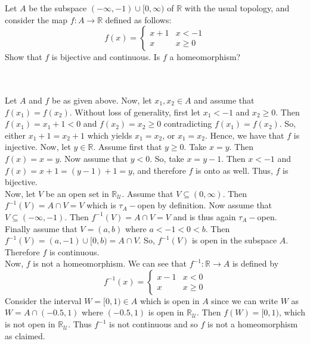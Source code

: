 Let $A$ be the subspace $(-\infty,-1)\cup [0,\infty)$ of $\mathbb{R}$ with the usual topology, and
consider the map $f:A\to \mathbb{R}$ defined as follows:
\[f(x)=\left\{ \begin{array}{ll}
                  x+1 & \mbox{$x<-1$}\\
                  x      & \mbox{$x\geq 0$}
                  \end{array}
          \right. \]
Show that $f$ is bijective and continuous. Is $f$ a homeomorphism?\\\\

\begin{solution}\renewcommand{\qedsymbol}{}\ \\
    Let $A$ and $f$ be as given above. Now, let $x_1,x_2\in A$ and assume that $f(x_1)=f(x_2)$. Without
    loss of generality, first let $x_1<-1$ and $x_2\geq0$. Then $f(x_1)=x_1+1<0$ and $f(x_2)=x_2\geq0$
    contradicting $f(x_1)=f(x_2)$. So, either $x_1+1=x_2+1$ which yields $x_1=x_2$, or $x_1=x_2$. Hence,
    we have that $f$ is injective. Now, let $y\in\mathbb{R}$. Assume first that $y\geq0$. Take $x=y$.
    Then $f(x)=x=y$. Now assume that $y<0$. So, take $x=y-1$. Then $x<-1$ and  $f(x)=x+1=(y-1)+1=y$, and
    therefore $f$ is onto as well. Thus, $f$ is bijective.\\Now, let $V$ be an open set in
    $\mathbb{R}_{\mathcal{U}}$. Assume that $V\subseteq(0,\infty)$. Then $f^{-1}(V)=A\cap V=V$ which is
    $\tau_{A}-$open by definition. Now assume that $V\subseteq(-\infty,-1)$. Then $f^{-1}(V)=A\cap V=V$
    and is thus again $\tau_{A}-$open. Finally assume that $V=(a,b)$ where $a<-1<0<b$. Then
    $f^{-1}(V)=(a,-1)\cup[0,b)=A\cap V$. So, $f^{-1}(V)$ is open in the subspace $A$. Therefore $f$ is
    continuous.\\
    Now, $f$ is not a homeomorphism. We can see that $f^{-1}:\mathbb{R}\rightarrow A$ is defined by 
    \[f^{-1}(x)=\left\{ \begin{array}{ll}
        x-1 & \mbox{$x<0$}\\
        x      & \mbox{$x\geq 0$}
        \end{array}
                \right. \]
    Consider the interval $W=[0,1)\in A$ which is open in $A$ since we can write $W$ as
    $W=A\cap(-0.5,1)$ where $(-0.5,1)$ is open in $\mathbb{R}_{\mathcal{U}}$. Then $f(W)=[0,1)$, which
    is not open in $\mathbb{R}_{\mathcal{U}}$. Thus $f^{-1}$ is not continuous and so $f$ is not a
    homeomorphism as claimed.

\end{solution}